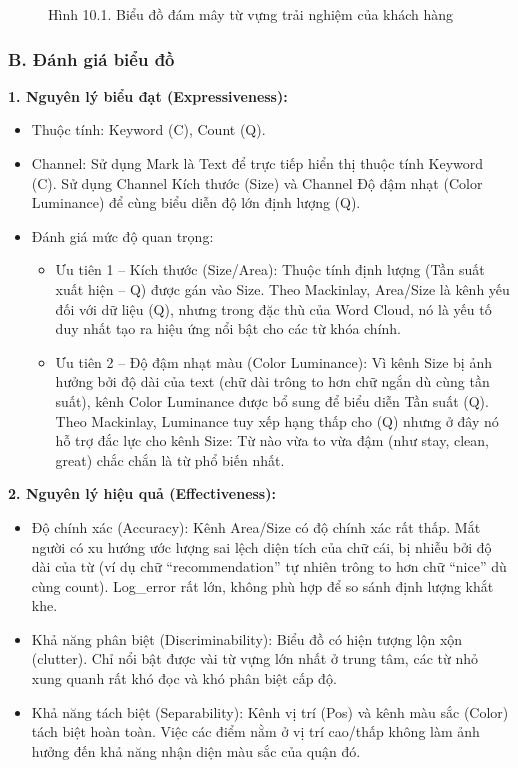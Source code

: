 \begin{figure}[H]
    \centering
    \caption{Hình 10.1. Biểu đồ đám mây từ vựng trải nghiệm của khách hàng}
    \label{fig:domain-task10-chart1}
\end{figure}

\subsubsection*{B. Đánh giá biểu đồ}

\textbf{1. Nguyên lý biểu đạt (Expressiveness):}

\begin{itemize}
    \item Thuộc tính: Keyword (C), Count (Q).
    \item Channel: Sử dụng Mark là Text để trực tiếp hiển thị thuộc tính Keyword (C). Sử dụng Channel Kích thước (Size) và Channel Độ đậm nhạt (Color Luminance) để cùng biểu diễn độ lớn định lượng (Q).
    \item Đánh giá mức độ quan trọng:
    \begin{itemize}
        \item Ưu tiên 1 -- Kích thước (Size/Area): Thuộc tính định lượng (Tần suất xuất hiện -- Q) được gán vào Size. Theo Mackinlay, Area/Size là kênh yếu đối với dữ liệu (Q), nhưng trong đặc thù của Word Cloud, nó là yếu tố duy nhất tạo ra hiệu ứng nổi bật cho các từ khóa chính.
        \item Ưu tiên 2 -- Độ đậm nhạt màu (Color Luminance): Vì kênh Size bị ảnh hưởng bởi độ dài của text (chữ dài trông to hơn chữ ngắn dù cùng tần suất), kênh Color Luminance được bổ sung để biểu diễn Tần suất (Q). Theo Mackinlay, Luminance tuy xếp hạng thấp cho (Q) nhưng ở đây nó hỗ trợ đắc lực cho kênh Size: Từ nào vừa to vừa đậm (như stay, clean, great) chắc chắn là từ phổ biến nhất.
    \end{itemize}
\end{itemize}

\textbf{2. Nguyên lý hiệu quả (Effectiveness):}

\begin{itemize}
    \item Độ chính xác (Accuracy): Kênh Area/Size có độ chính xác rất thấp. Mắt người có xu hướng ước lượng sai lệch diện tích của chữ cái, bị nhiễu bởi độ dài của từ (ví dụ chữ ``recommendation'' tự nhiên trông to hơn chữ ``nice'' dù cùng count). Log\_error rất lớn, không phù hợp để so sánh định lượng khắt khe.
    \item Khả năng phân biệt (Discriminability): Biểu đồ có hiện tượng lộn xộn (clutter). Chỉ nổi bật được vài từ vựng lớn nhất ở trung tâm, các từ nhỏ xung quanh rất khó đọc và khó phân biệt cấp độ.
    \item Khả năng tách biệt (Separability): Kênh vị trí (Pos) và kênh màu sắc (Color) tách biệt hoàn toàn. Việc các điểm nằm ở vị trí cao/thấp không làm ảnh hưởng đến khả năng nhận diện màu sắc của quận đó.
\end{itemize}

